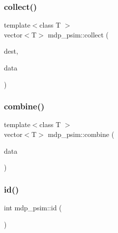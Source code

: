 \mbox{\label{classmdp__psim_aadde4dbf4d0c1577d1a8630064066293}} 
\subsubsection{\texorpdfstring{collect()}{collect()}}
{\footnotesize\ttfamily template$<$class T $>$ \\
vector$<$T$>$ mdp\+\_\+psim\+::collect (\begin{DoxyParamCaption}\item[{int}]{dest,  }\item[{T \&}]{data }\end{DoxyParamCaption})\hspace{0.3cm}{\ttfamily [inline]}}

\mbox{\label{classmdp__psim_a1a2fa73d8ef0d48f3d24b5a8fdeb1f20}} 
\subsubsection{\texorpdfstring{combine()}{combine()}}
{\footnotesize\ttfamily template$<$class T $>$ \\
vector$<$T$>$ mdp\+\_\+psim\+::combine (\begin{DoxyParamCaption}\item[{T \&}]{data }\end{DoxyParamCaption})\hspace{0.3cm}{\ttfamily [inline]}}

\mbox{\label{classmdp__psim_add120eb0aa77a4b73d0844eda58b0570}} 
\subsubsection{\texorpdfstring{id()}{id()}}
{\footnotesize\ttfamily int mdp\+\_\+psim\+::id (\begin{DoxyParamCaption}{ }\end{DoxyParamCaption})\hspace{0.3cm}{\ttfamily [inline]}}

\mbox{\label{classmdp__psim_ab3b24379c623c72635210d348399414e}} 
